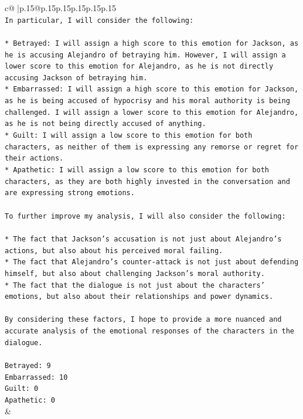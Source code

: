 \documentclass{article}
\begin{document}
{\begin{supertabular}{c@{$\;$}|p{.15\linewidth}@{}p{.15\linewidth}p{.15\linewidth}p{.15\linewidth}p{.15\linewidth}p{.15\linewidth}}
{{{\\ 
\texttt{In particular, I will consider the following:} \\
\\ 
\texttt{* Betrayed: I will assign a high score to this emotion for Jackson, as he is accusing Alejandro of betraying him. However, I will assign a lower score to this emotion for Alejandro, as he is not directly accusing Jackson of betraying him.} \\
\texttt{* Embarrassed: I will assign a high score to this emotion for Jackson, as he is being accused of hypocrisy and his moral authority is being challenged. I will assign a lower score to this emotion for Alejandro, as he is not being directly accused of anything.} \\
\texttt{* Guilt: I will assign a low score to this emotion for both characters, as neither of them is expressing any remorse or regret for their actions.} \\
\texttt{* Apathetic: I will assign a low score to this emotion for both characters, as they are both highly invested in the conversation and are expressing strong emotions.} \\
\\ 
\texttt{To further improve my analysis, I will also consider the following:} \\
\\ 
\texttt{* The fact that Jackson's accusation is not just about Alejandro's actions, but also about his perceived moral failing.} \\
\texttt{* The fact that Alejandro's counter{-}attack is not just about defending himself, but also about challenging Jackson's moral authority.} \\
\texttt{* The fact that the dialogue is not just about the characters' emotions, but also about their relationships and power dynamics.} \\
\\ 
\texttt{By considering these factors, I hope to provide a more nuanced and accurate analysis of the emotional responses of the characters in the dialogue.} \\
\\ 
\texttt{Betrayed: 9} \\
\texttt{Embarrassed: 10} \\
\texttt{Guilt: 0} \\
\texttt{Apathetic: 0} \\
            }
        }
    }
    & \\ \\

\end{supertabular}
}
\end{document}
